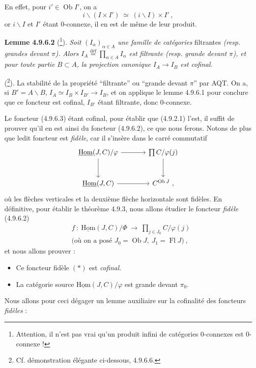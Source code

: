 \documentclass[11pt]{article}
\newcommand{\printedpage}[1]{\marginpar{\footnotesize p.~#1}}
\newcommand{\msp}[1]{\marginpar{\footnotesize [#1]}}
\newcommand{\uHom}{\underline{\mathrm{Hom}}}
\newcommand{\Ob}{\operatorname{Ob}}
\newcommand{\Fl}{\operatorname{Fl}}
\begin{document}
En effet, pour $i' \in \Ob I'$, on a
\[
i\backslash(I \times I') \ \simeq \ (i\backslash I) \times I' \ ,
\]
or $i\backslash I$ et $I'$ étant 0-connexe, il en est de même de leur produit.

\textbf{Lemme 4.9.6.2} (\footnote[97]{Attention, il n'est pas vrai qu'un produit infini de catégories 0-connexes est 0-connexe !}). \textit{Soit $(I_\alpha)_{\alpha \in A}$ une famille de catégories} filtrantes \textit{(resp. grandes devant $\pi$). Alors $I_A \stackrel{\text{déf}}{=} \prod_{\alpha \in A} I_\alpha$ est filtrante (resp. grande devant $\pi$), et pour toute partie $B \subset A$, la projection canonique $I_A \longrightarrow I_B$ est cofinal.} %

(\footnote[98]{Cf. démonstration élégante ci-dessous, 4.9.6.6.}). La stabilité de la propriété “filtrante” ou “grande devant $\pi$” par AQT. On a, si $B' = A\backslash B$, $I_A \simeq I_B \times I_{B'} \longrightarrow I_B$, et on applique le lemme 4.9.6.1 pour conclure que ce foncteur est cofinal, $I_{B'}$ étant filtrante, donc 0-connexe.

\msp{page 223}Le foncteur (4.9.6.3) étant cofinal, pour établir que (4.9.2.1) l'est, il suffit de prouver qu'il en est ainsi du foncteur (4.9.6.2), ce que nous ferons. Notons de plus que ledit foncteur est \textit{fidèle}, car il s'insère dans le carré commutatif
\[
\begin{tikzcd}[column sep=large, row sep=large]
\uHom(J,C)/\varphi \arrow[r] \arrow[d] & \prod C/\varphi(j) \arrow[d] \\
\uHom(J,C) \arrow[r] & C^{\Ob J}\ ,
\end{tikzcd}
\]
\printedpage{81}
où les flèches verticales et la deuxième flèche horizontale sont fidèles. En définitive, pour établir le théorème 4.9.3, nous allons étudier le foncteur \textit{fidèle} (4.9.6.2)
\[
\begin{aligned}
&f \ : \ \uHom(J,C)/\Phi \ \longrightarrow \ \textstyle\prod_{j \in J_0} C/\varphi(j) \\ %
&\text{(où on a posé } J_0 = \Ob J,\ J_1 = \Fl J) \ ,
\end{aligned}
\tag*{$(*)$}
\]
et nous allons prouver :
\begin{itemize}[label={}]
\item[\textcircled{a}] Ce foncteur fidèle $(*)$ est \textit{cofinal.}
\item[\textcircled{b}] La catégorie source $\uHom(J,C)/\varphi$ est grande devant $\pi_0$.
\end{itemize}
Nous allons pour ceci dégager un lemme auxiliaire sur la cofinalité des foncteurs \textit{fidèles} :
\end{document}

